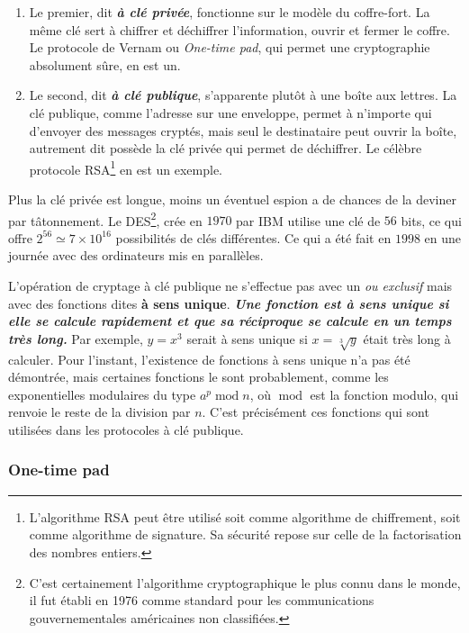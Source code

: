 \begin{enumerate}
\item Le premier, dit \textbf{\emph{à clé privée}}, fonctionne sur le modèle du
coffre-fort. La même clé sert à chiffrer et déchiffrer l'information, ouvrir et
fermer le coffre. Le protocole de Vernam ou \emph{One-time pad}, qui permet une
cryptographie absolument sûre, en est un.

\item Le second, dit \textbf{\emph{à clé publique}}, s'apparente plutôt à une
boîte aux lettres. La clé publique, comme l'adresse sur une enveloppe, permet à
n'importe qui d'envoyer des messages cryptés, mais seul le destinataire peut
ouvrir la boîte, autrement dit possède la clé privée qui permet de déchiffrer.
Le célèbre protocole RSA\footnote{L'algorithme RSA peut être utilisé soit comme
algorithme de chiffrement, soit comme algorithme de signature. Sa sécurité
repose sur celle de la factorisation des nombres entiers.} en est un exemple.
\end{enumerate}

Plus la clé privée est longue, moins un éventuel espion a de chances de la
deviner par tâtonnement. Le DES\footnote{C'est certainement l'algorithme
cryptographique le plus connu dans le monde, il fut établi en 1976 comme
standard pour les communications gouvernementales américaines non classifiées.},
crée en $1970$ par IBM utilise une clé de $56$ bits, ce qui offre
$2^{56}\simeq\allowbreak7\times10^{16}$ possibilités de clés différentes. Ce qui
a été fait en $1998$ en une journée avec des ordinateurs mis en parallèles.

L'opération de cryptage à clé publique ne s'effectue pas avec un \emph{ou
exclusif} mais avec des fonctions dites \textbf{à sens unique}.\textbf{
\emph{Une fonction est à sens unique si elle se calcule rapidement et que sa
réciproque se calcule en un temps très long.}} Par exemple, $y=x^{3}$ serait à
sens unique si $x=\sqrt[3]{y}$ était très long à calculer. Pour l'instant,
l'existence de fonctions à sens unique n'a pas été démontrée, mais certaines
fonctions le sont probablement, comme les exponentielles modulaires du type
$a^{p}\operatorname{mod}n$, où $\operatorname{mod}$ est la fonction modulo,
qui renvoie le reste de la division par $n$. C'est précisément ces fonctions qui
sont utilisées dans les protocoles à clé publique.

\subsubsection{One-time pad}

